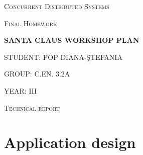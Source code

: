 \documentclass{article}
\begin{document}
\begin{titlepage}
	\centering
    \vspace{3cm}
	{\scshape\Large Concurrent Distributed Systems\par}
	{\scshape\Large Final Homework\par}
	\vspace{4cm}
	{\huge\bfseries\LARGE SANTA CLAUS WORKSHOP PLAN \par}
	\vspace{2cm}
	{\Large STUDENT: POP DIANA-\c{S}TEFANIA\par}
	\vspace{1cm}
	{\Large GROUP: C.EN. 3.2A\par}
	\vspace{1cm}
	{\Large YEAR: III\par}
	\vspace{1cm}
	\vfill

\end{titlepage}


\begin{centering}
\vspace{1cm}
{\scshape\Large Technical report \par}
\end{centering}
\vspace{1.5cm}

\section{Application design}
\end{document}
